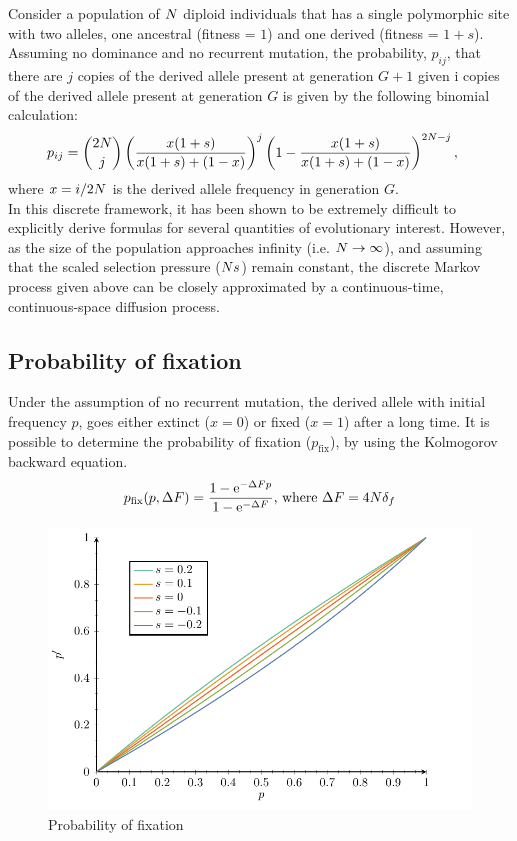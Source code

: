 Consider a population of $N$ diploid individuals that has a single polymorphic site with two alleles, one ancestral (fitness = $1$) and one derived (fitness = $1+s$). Assuming no dominance and no recurrent mutation, the probability, $p_{ij}$, that there are $j$ copies of the derived allele present at generation $G+1$ given i copies of the derived allele present at generation $G$ is given by the following binomial calculation:
\begin{align}
	p_{ij} & = \binom{2 N}{j} \left( \dfrac{x(1+s)}{x(1+s) + (1-x)} \right)^j \left(1 - \dfrac{x(1+s)}{x(1+s) + (1-x)} \right)^{2 N -j}, 
\end{align}
where $x = i / 2 N$ is the derived allele frequency in generation $G$.\\

In this discrete framework, it has been shown to be extremely difficult to explicitly derive formulas for several quantities of evolutionary interest. However, as the size of the population approaches infinity (i.e. $ N \rightarrow \infty$), and assuming that the scaled selection pressure ($N s $) remain constant, the discrete Markov process given above can be closely approximated by a continuous-time, continuous-space diffusion process.\\


\subsection*{Probability of fixation}

Under the assumption of no recurrent mutation, the derived allele with initial frequency $p$, goes either extinct ($x=0$) or fixed ($x=1$) after a long time.
It is possible to determine the probability of fixation ($p_{\mathrm{fix}}$), by using the Kolmogorov backward equation.
\begin{equation}
p_{\mathrm{fix}}(p, {\Delta F} ) = \dfrac{1 - \mathrm{e}^{-{\Delta F} p }}{1 - \mathrm{e}^{-{\Delta F}}}\text{, where } {\Delta F}=4N {\delta_{f}} 
\end{equation}
\begin{figure}[thbp]
	\begin{center}
		\includegraphics[width=\textwidth, page=3] {figures.pdf}
	\end{center}
	\caption{Probability of fixation}
\end{figure}

